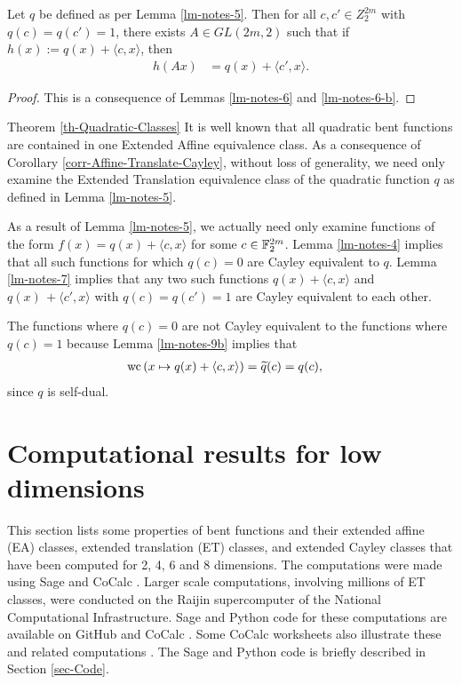 \begin{Lemma}
\label{lm-notes-7}
Let $q$ be defined as per Lemma \ref{lm-notes-5}.
Then for all $c, c' \in Z_2^{2 m}$ with $q(c)=q(c')=1$, there exists $A \in GL(2 m, 2)$ such that
if $h(x) := q(x) + \langle c, x \rangle$, then
\begin{align*}
h(A x) &= q(x) + \langle c', x \rangle.
\end{align*}
\end{Lemma}

\begin{proof}
This is a consequence of Lemmas \ref{lm-notes-6} and \ref{lm-notes-6-b}.
\end{proof}

\begin{proofof}{Theorem \ref{th-Quadratic-Classes}}
It is well known that all quadratic bent functions are contained in one Extended Affine equivalence
class.
As a consequence of Corollary \ref{corr-Affine-Translate-Cayley}, without loss of generality, we need
only examine
the Extended Translation equivalence class of the quadratic function $q$ as defined in Lemma
\ref{lm-notes-5}.

As a result of Lemma \ref{lm-notes-5}, we actually need only examine functions of the form
$f(x) = q(x) + \langle c,x \rangle$
for some $c \in \mathbb{F}_2^{2m}$.
Lemma \ref{lm-notes-4} implies that all such functions for which $q(c)=0$ are Cayley equivalent to
$q$.
Lemma \ref{lm-notes-7} implies that any two such functions $q(x) + \langle c, x \rangle$ and $q(x)\, +
\langle c', x \rangle$
with $q(c)=q(c')=1$ are Cayley equivalent to each other.

The functions where $q(c)=0$ are not Cayley equivalent to the functions where $q(c)=1$ because
Lemma \ref{lm-notes-9b} implies that
\begin{align*}
\operatorname{wc}\left(x \mapsto q(x) + \langle c,x \rangle\right)
&=
\widetilde{q}(c) = q(c),
\end{align*}
since $q$ is self-dual.
\end{proofof}


\section{Computational results for low dimensions}
\label{sec-Empirical}
This section lists some properties of bent functions and their extended affine (EA) classes, extended translation (ET) classes, and extended Cayley classes
that have been computed for 2, 4, 6 and 8 dimensions.
The computations were made using Sage \cite{SageMath7517} and CoCalc \cite{CoCalc}.
Larger scale computations, involving millions of ET classes,
were conducted on the Raijin supercomputer of the National Computational Infrastructure.
Sage and Python code for these computations are available on GitHub \cite{Leo16GitHub} and CoCalc \cite{Leo17CoCalc}.
Some CoCalc worksheets also illustrate these and related computations \cite{Leo17CoCalc}.
The Sage and Python code is briefly described in Section \ref{sec-Code}.

